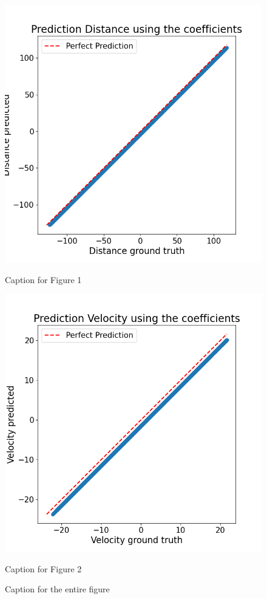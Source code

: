 \begin{figure}[htbp]
    \centering
    \begin{minipage}[b]{0.45\columnwidth}
        \centering
        \includegraphics[width=\columnwidth]{images/figures/Prediction Distance using the coefficients.png}
        \caption{Caption for Figure 1}
        \label{fig:minipage3}
    \end{minipage}
    \hfill
    \begin{minipage}[b]{0.45\columnwidth}
        \centering
        \includegraphics[width=\columnwidth]{images/figures/Prediction Velocity using the coefficients.png}
        \caption{Caption for Figure 2}
        \label{fig:minipage4}
    \end{minipage}
    \caption{Caption for the entire figure}
    \label{fig:combined_figure_2}
\end{figure}

